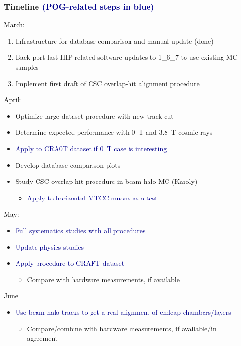 \documentclass[compress]{beamer}
\begin{document}
\begin{frame}
\frametitle{Timeline \textcolor{darkblue}{\small (POG-related steps in blue)}}
\scriptsize

\textcolor{black}{March:}
\begin{enumerate}
\item \scriptsize Infrastructure for database comparison and manual update (done)
\item \scriptsize Back-port last HIP-related software updates to 1\_6\_7 to use existing MC samples
\item \scriptsize Implement first draft of CSC overlap-hit alignment procedure
\end{enumerate}

\textcolor{black}{April:}
\begin{itemize}
\item \scriptsize Optimize large-dataset procedure with new track cut
\item \scriptsize Determine expected performance with 0~T and 3.8~T cosmic rays
\item \scriptsize \textcolor{darkblue}{Apply to CRA0T dataset if 0~T case is interesting}
\item \scriptsize Develop database comparison plots
\item \scriptsize Study CSC overlap-hit procedure in beam-halo MC (Karoly)
\begin{itemize}
\item \scriptsize \textcolor{darkblue}{Apply to horizontal MTCC muons as a test}
\end{itemize}
\end{itemize}

\vspace{-0.25 cm}
\textcolor{black}{May:}
\begin{itemize}
\item \scriptsize \textcolor{darkblue}{Full systematics studies with all procedures}
\item \scriptsize \textcolor{darkblue}{Update physics studies}
\item \scriptsize \textcolor{darkblue}{Apply procedure to CRAFT dataset}
\begin{itemize}
\item \scriptsize Compare with hardware measurements, if available
\end{itemize}
\end{itemize}

\vspace{-0.25 cm}
\textcolor{black}{June:}
\begin{itemize}
\item \scriptsize \textcolor{darkblue}{Use beam-halo tracks to get a real alignment of endcap chambers/layers}
\begin{itemize}
\item \scriptsize Compare/combine with hardware measurements, if available/in agreement
\end{itemize}
\end{itemize}


\end{frame}
\end{document}
